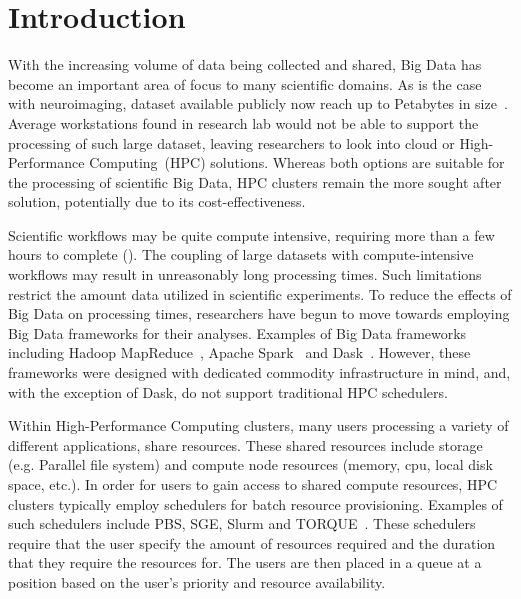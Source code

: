 \documentclass{IEEEtran}
\begin{document}
\section{Introduction}

With the increasing volume of data being collected and shared, Big Data has become
an important area of focus to many scientific domains. As is the case with neuroimaging,
dataset available publicly now reach up to Petabytes in size~\cite{UKBiobank, hcp}. Average workstations found in research lab would not be
able to support the processing of such large dataset, leaving researchers to look 
into cloud or High-Performance Computing~(HPC) solutions. Whereas both options are
suitable for the processing of scientific Big Data, HPC clusters remain the more 
sought after solution, potentially due to its cost-effectiveness.

Scientific workflows may be quite compute intensive, requiring more than a few
hours to complete (\cite{freesurfer, fmriprep, a paper which mentions duration}).
The coupling of large datasets with compute-intensive workflows may result in 
unreasonably long processing times. Such limitations restrict the amount data 
utilized in scientific experiments. To reduce the effects of Big Data on processing
times, researchers have begun to move towards employing Big Data frameworks for their
analyses. Examples of Big Data frameworks including Hadoop MapReduce~\cite{Hadoop},
Apache Spark~\cite{Spark} and Dask~\cite{Dask}. However, these frameworks were 
designed with dedicated commodity infrastructure in mind, and, with the exception
of Dask, do not support traditional HPC schedulers.

Within High-Performance Computing clusters, many users processing a variety of different
applications, share resources. These shared resources include storage (e.g. Parallel file system) and 
compute node resources (memory, cpu, local disk space, etc.). In order for users to 
gain access to shared compute resources, HPC clusters typically employ schedulers for 
batch resource provisioning. Examples of such schedulers include PBS, SGE, Slurm and 
TORQUE~\cite{schedulers}. These schedulers require that the user specify the amount
of resources required and the duration that they require the resources for. The users 
are then placed in a queue at a position based on the user's priority and resource 
availability.
\end{document}
